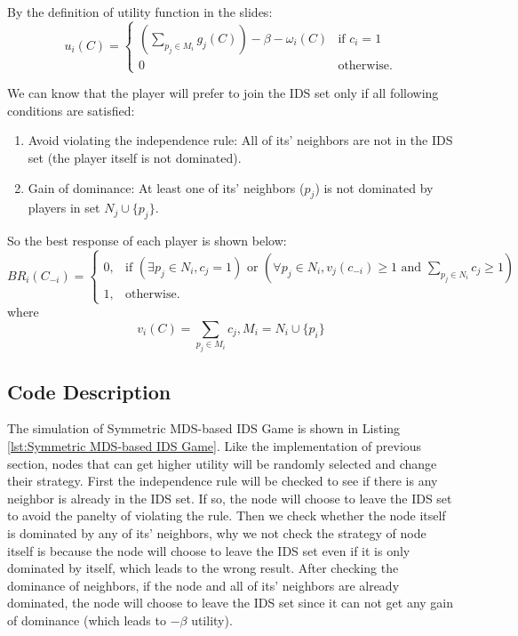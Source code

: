 \documentclass[a4paper, oneside, final, 12pt]{scrartcl} %
\begin{document}
By the definition of utility function in the slides:
$$u_i(C)=
\begin{cases}
  \left(\sum_{p_j \in M_i}{g_j(C)}\right) - \beta - \omega_{i}(C) & \text{if } c_i = 1 \\
  0 & \text{otherwise.}
\end{cases}
$$

We can know that the player will prefer to join the IDS set 
only if all following conditions are satisfied:
\begin{enumerate}
  \item Avoid violating the independence rule: All of its' neighbors are not in the IDS set 
  (the player itself is not dominated).
  \item Gain of dominance: At least one of its' neighbors ($p_j$) is not 
  dominated by players in set $N_j \cup \{p_j\}$.
\end{enumerate}

So the best response of each player is shown below:
$$
BR_i(C_{-i}) =
\begin{cases}
  0, & \text{if } \left(\exists p_j \in N_i, c_j = 1\right) \text{ or } 
  \left( \forall p_j \in N_i, v_j(c_{-i}) \ge 1 \text{ and } 
  \sum_{p_j \in N_i}{c_j} \ge 1 \right) \\
  1, & \text{otherwise.}
\end{cases}
$$
where
$$v_i(C) = \sum_{p_j \in M_i}{c_j}, M_i = N_i \cup \{p_i\}$$

\subsection{Code Description}

The simulation of Symmetric MDS-based IDS Game is shown in 
Listing \ref{lst:Symmetric MDS-based IDS Game}.
Like the implementation of previous section,
nodes that can get higher utility will be randomly selected and change their strategy.
First the independence rule will be checked to see 
if there is any neighbor is already in the IDS set.
If so, the node will choose to leave the IDS set to avoid the panelty  of violating the rule.
Then we check whether the node itself is dominated by any of its' neighbors, 
why we not check the strategy of node itself is because
the node will choose to leave the IDS set even if it is only dominated by itself, 
which leads to the wrong result.
After checking the dominance of neighbors,
if the node and all of its' neighbors are already dominated,
the node will choose to leave the IDS set since it can not get any gain of dominance
(which leads to $-\beta$ utility).
\end{document}
